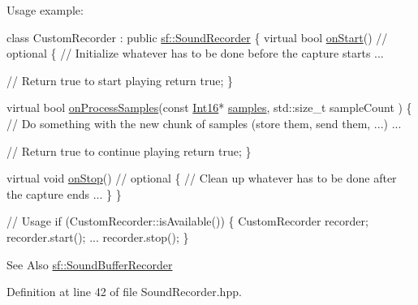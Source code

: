 Usage example\-: 
\begin{DoxyCode}
\textcolor{keyword}{class }CustomRecorder : \textcolor{keyword}{public} \hyperlink{classsf_1_1_sound_recorder}{sf::SoundRecorder}
\{
    \textcolor{keyword}{virtual} \textcolor{keywordtype}{bool} \hyperlink{classsf_1_1_sound_recorder_a7af418fb036201d3f85745bef78ce77f}{onStart}() \textcolor{comment}{// optional}
    \{
        \textcolor{comment}{// Initialize whatever has to be done before the capture starts}
        ...

        \textcolor{comment}{// Return true to start playing}
        \textcolor{keywordflow}{return} \textcolor{keyword}{true};
    \}

    \textcolor{keyword}{virtual} \textcolor{keywordtype}{bool} \hyperlink{classsf_1_1_sound_recorder_a2670124cbe7a87c7e46b4840807f4fd7}{onProcessSamples}(\textcolor{keyword}{const} \hyperlink{namespacesf_a3c8e10435e2a310a7741755e66b5c94e}{Int16}* \hyperlink{gl3_8h_aba70cd077c2c52c15358c231c6d293aa}{samples}, std::size\_t sampleCount
      )
    \{
        \textcolor{comment}{// Do something with the new chunk of samples (store them, send them, ...)}
        ...

        \textcolor{comment}{// Return true to continue playing}
        \textcolor{keywordflow}{return} \textcolor{keyword}{true};
    \}

    \textcolor{keyword}{virtual} \textcolor{keywordtype}{void} \hyperlink{classsf_1_1_sound_recorder_aefc36138ca1e96c658301280e4a31b64}{onStop}() \textcolor{comment}{// optional}
    \{
        \textcolor{comment}{// Clean up whatever has to be done after the capture ends}
        ...
    \}
\}

\textcolor{comment}{// Usage}
\textcolor{keywordflow}{if} (CustomRecorder::isAvailable())
\{
    CustomRecorder recorder;
    recorder.start();
    ...
    recorder.stop();
\}
\end{DoxyCode}


\begin{DoxySeeAlso}{See Also}
\hyperlink{classsf_1_1_sound_buffer_recorder}{sf\-::\-Sound\-Buffer\-Recorder} 
\end{DoxySeeAlso}


Definition at line 42 of file Sound\-Recorder.\-hpp.



